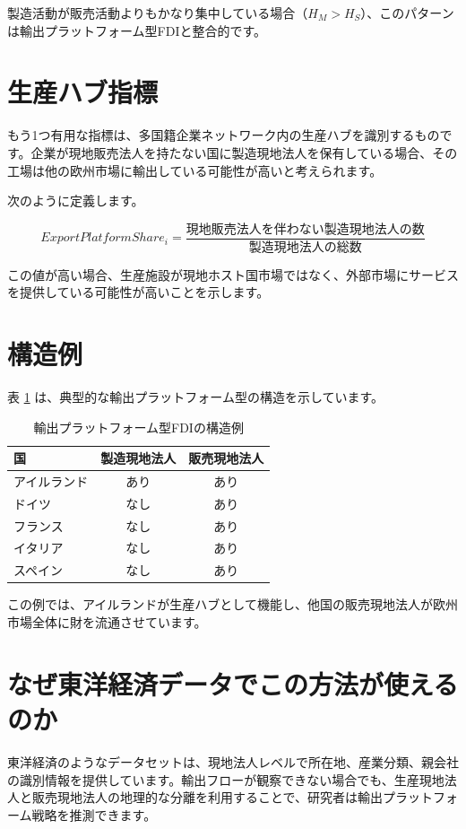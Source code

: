 \documentclass[11pt]{article}
\begin{document}
製造活動が販売活動よりもかなり集中している場合（\(H_M > H_S\)）、このパターンは輸出プラットフォーム型FDIと整合的です。

\section{生産ハブ指標}

もう1つ有用な指標は、多国籍企業ネットワーク内の生産ハブを識別するものです。企業が現地販売法人を持たない国に製造現地法人を保有している場合、その工場は他の欧州市場に輸出している可能性が高いと考えられます。

次のように定義します。

\[
ExportPlatformShare_i =
\frac{\text{現地販売法人を伴わない製造現地法人の数}}
{\text{製造現地法人の総数}}
\]

この値が高い場合、生産施設が現地ホスト国市場ではなく、外部市場にサービスを提供している可能性が高いことを示します。

\section{構造例}

表 \ref{tab:example} は、典型的な輸出プラットフォーム型の構造を示しています。

\begin{table}[h]
\centering
\begin{tabular}{lcc}
\toprule
国 & 製造現地法人 & 販売現地法人 \\
\midrule
アイルランド & あり & あり \\
ドイツ & なし & あり \\
フランス & なし & あり \\
イタリア & なし & あり \\
スペイン & なし & あり \\
\bottomrule
\end{tabular}
\caption{輸出プラットフォーム型FDIの構造例}
\label{tab:example}
\end{table}

この例では、アイルランドが生産ハブとして機能し、他国の販売現地法人が欧州市場全体に財を流通させています。

\section{なぜ東洋経済データでこの方法が使えるのか}

東洋経済のようなデータセットは、現地法人レベルで所在地、産業分類、親会社の識別情報を提供しています。輸出フローが観察できない場合でも、生産現地法人と販売現地法人の地理的な分離を利用することで、研究者は輸出プラットフォーム戦略を推測できます。
\end{document}
